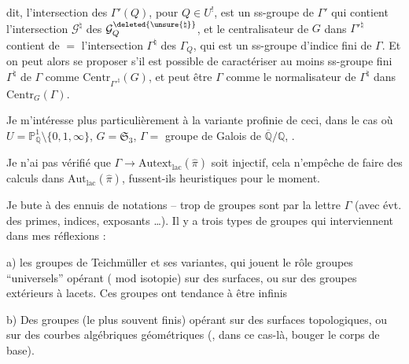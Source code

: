 
dit, l'intersection  des $\Gamma'(Q)$, pour $Q\in U^{!}$, est un ss-groupe de $\Gamma'$ qui contient l'intersection  $\mathcal G^{\natural}$ des $\mathcal G_Q^{\deleted{\unsure{\natural}}}$, et le centralisateur de $G$ dans $\Gamma'^{\natural}$ contient de $=$ l'intersection  $\Gamma^{\natural}$ des $\Gamma_Q$, qui est un ss-groupe  d'indice fini de $\Gamma$. Et on peut alors se proposer s'il est possible de caractériser au moins  ss-groupe fini $\Gamma^{\natural}$ de $\Gamma$ comme $\mathrm{Centr}_{\Gamma'^{\natural}}(G)$, et  peut être $\Gamma$ comme le normalisateur de $\Gamma^{\natural}$ dans  $\mathrm{Centr}_{G}(\Gamma)$.

Je m'intéresse plus particulièrement à la variante profinie de ceci, dans le cas où $U=\mathbb P^1_{\mathbb Q}\setminus\{0,1,\infty\}$, $G=\mathfrak S_3$, $\Gamma={}$ groupe de Galois de $\overline{\mathbb Q}/\mathbb Q$,  .

Je n'ai pas vérifié que $\Gamma\longrightarrow\mathrm{Autext}_{\mathrm{lac}}(\widehat\pi)$ soit injectif, cela n'empêche de faire des calculs dans $\mathrm{Aut}_{\mathrm{lac}}(\widehat\pi)$, fussent-ils heuristiques pour le moment.


Je bute à des ennuis de notations -- trop de groupes sont  par la lettre $\Gamma$ (avec évt. des primes, indices, exposants \ldots). Il y a trois types de groupes qui interviennent dans mes réflexions :

a) les groupes de Teichmüller et ses variantes, qui jouent le rôle  groupes ``universels'' opérant ( mod isotopie) sur des surfaces, ou sur des groupes  extérieurs à lacets. Ces groupes ont tendance à être infinis

b) Des groupes (le plus souvent finis) opérant sur des surfaces topologiques, ou sur des courbes algébriques géométriques (, dans ce cas-là, bouger le corps de base).



